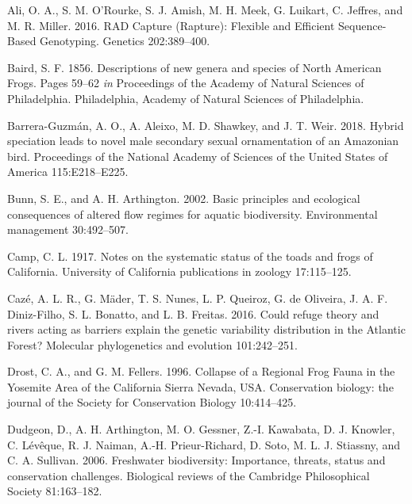 \documentclass[twoside,12pt,final]{ucthesis-CA2012} %
\begin{document}
\begin{ucmainmatter}
\leavevmode\hypertarget{ref-ali_rad_2016}{}%
Ali, O. A., S. M. O'Rourke, S. J. Amish, M. H. Meek, G. Luikart, C.
Jeffres, and M. R. Miller. 2016. RAD Capture (Rapture): Flexible and
Efficient Sequence-Based Genotyping. Genetics 202:389--400.

\leavevmode\hypertarget{ref-baird_descriptions_1856}{}%
Baird, S. F. 1856. Descriptions of new genera and species of North
American Frogs. Pages 59--62 \emph{in} Proceedings of the Academy of
Natural Sciences of Philadelphia. Philadelphia, Academy of Natural
Sciences of Philadelphia.

\leavevmode\hypertarget{ref-barrera-guzman_hybrid_2018}{}%
Barrera-Guzmán, A. O., A. Aleixo, M. D. Shawkey, and J. T. Weir. 2018.
Hybrid speciation leads to novel male secondary sexual ornamentation of
an Amazonian bird. Proceedings of the National Academy of Sciences of
the United States of America 115:E218--E225.

\leavevmode\hypertarget{ref-bunn_basic_2002}{}%
Bunn, S. E., and A. H. Arthington. 2002. Basic principles and ecological
consequences of altered flow regimes for aquatic biodiversity.
Environmental management 30:492--507.

\leavevmode\hypertarget{ref-camp_notes_1917}{}%
Camp, C. L. 1917. Notes on the systematic status of the toads and frogs
of California. University of California publications in zoology
17:115--125.

\leavevmode\hypertarget{ref-caze_could_2016}{}%
Cazé, A. L. R., G. Mäder, T. S. Nunes, L. P. Queiroz, G. de Oliveira, J.
A. F. Diniz-Filho, S. L. Bonatto, and L. B. Freitas. 2016. Could refuge
theory and rivers acting as barriers explain the genetic variability
distribution in the Atlantic Forest? Molecular phylogenetics and
evolution 101:242--251.

\leavevmode\hypertarget{ref-drost_collapse_1996}{}%
Drost, C. A., and G. M. Fellers. 1996. Collapse of a Regional Frog Fauna
in the Yosemite Area of the California Sierra Nevada, USA. Conservation
biology: the journal of the Society for Conservation Biology
10:414--425.

\leavevmode\hypertarget{ref-dudgeon_freshwater_2006}{}%
Dudgeon, D., A. H. Arthington, M. O. Gessner, Z.-I. Kawabata, D. J.
Knowler, C. Lévêque, R. J. Naiman, A.-H. Prieur-Richard, D. Soto, M. L.
J. Stiassny, and C. A. Sullivan. 2006. Freshwater biodiversity:
Importance, threats, status and conservation challenges. Biological
reviews of the Cambridge Philosophical Society 81:163--182.


\end{ucmainmatter}
\end{document}
